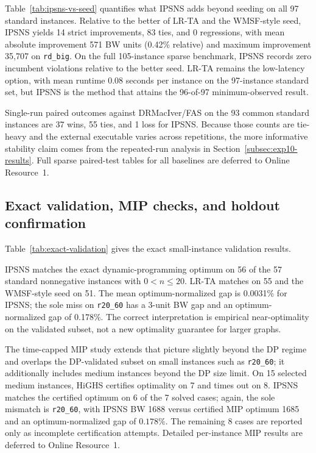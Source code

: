 Table~\ref{tab:ipsns-vs-seed} quantifies what IPSNS adds beyond seeding on all 97 standard instances. Relative to the better of LR-TA and the WMSF-style seed, IPSNS yields 14 strict improvements, 83 ties, and 0 regressions, with mean absolute improvement 571 BW units (0.42\% relative) and maximum improvement 35{,}707 on \texttt{rd\_big}. On the full 105-instance sparse benchmark, IPSNS records zero incumbent violations relative to the better seed. LR-TA remains the low-latency option, with mean runtime \(0.08\) seconds per instance on the 97-instance standard set, but IPSNS is the method that attains the 96-of-97 minimum-observed result.

Single-run paired outcomes against DRMacIver/FAS on the 93 common standard instances are 37 wins, 55 ties, and 1 loss for IPSNS. Because those counts are tie-heavy and the external executable varies across repetitions, the more informative stability claim comes from the repeated-run analysis in Section~\ref{subsec:exp10-results}. Full sparse paired-test tables for all baselines are deferred to Online Resource~1.



\subsection{Exact validation, MIP checks, and holdout confirmation}

Table~\ref{tab:exact-validation} gives the exact small-instance validation results.



IPSNS matches the exact dynamic-programming optimum on 56 of the 57 standard nonnegative instances with \(0<n\le 20\). LR-TA matches on 55 and the WMSF-style seed on 51. The mean optimum-normalized gap is 0.0031\% for IPSNS; the sole miss on \texttt{r20\_60} has a 3-unit BW gap and an optimum-normalized gap of 0.178\%. The correct interpretation is empirical near-optimality on the validated subset, not a new optimality guarantee for larger graphs.

The time-capped MIP study extends that picture slightly beyond the DP regime and overlaps the DP-validated subset on small instances such as \texttt{r20\_60}; it additionally includes medium instances beyond the DP size limit. On 15 selected medium instances, HiGHS certifies optimality on 7 and times out on 8. IPSNS matches the certified optimum on 6 of the 7 solved cases; again, the sole mismatch is \texttt{r20\_60}, with IPSNS BW 1688 versus certified MIP optimum 1685 and an optimum-normalized gap of \(0.178\%\). The remaining 8 cases are reported only as incomplete certification attempts. Detailed per-instance MIP results are deferred to Online Resource~1.

